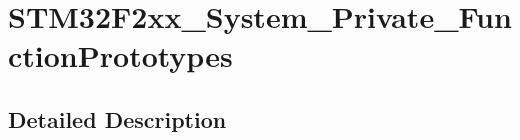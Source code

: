 \hypertarget{group___s_t_m32_f2xx___system___private___function_prototypes}{\section{S\-T\-M32\-F2xx\-\_\-\-System\-\_\-\-Private\-\_\-\-Function\-Prototypes}
\label{group___s_t_m32_f2xx___system___private___function_prototypes}
}


\subsection{Detailed Description}
